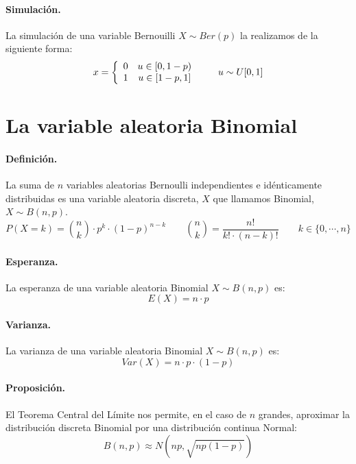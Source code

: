 \paragraph{Simulaci\'on.} La simulaci\'on de una variable Bernouilli 
$X \sim Ber(p)$ la realizamos de la siguiente forma:
\begin{displaymath}
x= \left\{
\begin{array}{cc}
0 & u \in [0,1-p) \cr
1 & u \in [1-p,1]
\end{array}
\right.
\qquad u \sim U[0,1]
\end{displaymath}


\section{La variable aleatoria Binomial}

\paragraph{Definici\'on.} La suma de $n$ variables aleatorias Bernoulli 
independientes e id\'enticamente distribuidas es una variable aleatoria discreta, 
$X$ que llamamos Binomial, $X \sim B(n,p)$.
\begin{displaymath}
P(X=k) = {n \choose k} \cdot p^k \cdot (1-p)^{n-k} \qquad {n \choose k} = \frac{n!}{k! \cdot (n-k)!}
\qquad k \in \{0, \cdots, n\}
\end{displaymath}

\paragraph{Esperanza.} La esperanza de una variable aleatoria Binomial 
$X \sim B(n,p)$ es:
\begin{displaymath}
E(X) = n \cdot p
\end{displaymath}

\paragraph{Varianza.} La varianza de una variable aleatoria Binomial 
$X \sim B(n,p)$ es:
\begin{displaymath}
Var(X)= n \cdot p \cdot (1-p)
\end{displaymath}

\paragraph{Proposici\'on.} El Teorema Central del L\'imite nos permite, en el
caso de $n$ grandes, aproximar la distribuci\'on discreta Binomial por una 
distribuci\'on continua Normal:
\begin{displaymath}
B(n,p) \approx N\left(n p, \sqrt{n p (1-p)}\right)
\end{displaymath}


